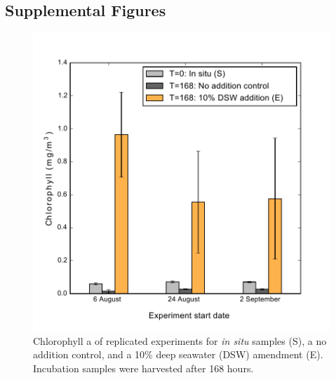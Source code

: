 \subsection{Supplemental Figures}

\begin{figure}[h!]
  \centering
    \includegraphics[width=1\textwidth]{Images/C4_FigureS1.pdf}
    \caption[Chlorophyll a of replicated experiments for \emph{in situ} samples, no addition control, and a 10\% deep seawater amendment]{Chlorophyll a of replicated experiments for \emph{in situ} samples (S), a no addition control, and a 10\% deep seawater (DSW) amendment (E). Incubation samples were harvested after 168 hours.}
  \label{fig:a4f1}
\end{figure}



